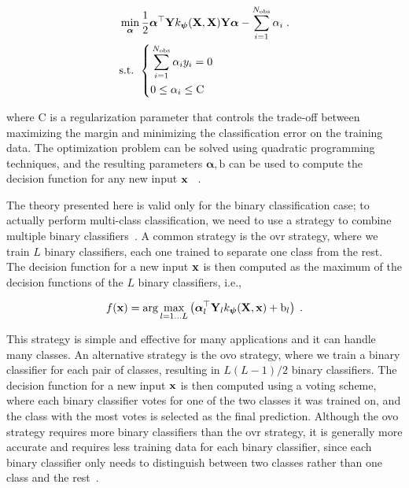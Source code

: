 \begin{equation}
  \left.
  \begin{aligned}
    &\min_{\boldsymbol{\alpha}} \frac{1}{2} \boldsymbol{\alpha}^{\top} \mathbf{Y} k_{\boldsymbol{\psi}}(\mathbf{X}, \mathbf{X}) \mathbf{Y} \boldsymbol{\alpha} - \sum_{i=1}^{N_{\mathrm{obs}}} \alpha_i\;.\\
    &\text{s.t. } \left\{
    \begin{aligned}
      &\sum_{i=1}^{N_{\mathrm{obs}}} \alpha_i y_i = 0\\
      &0 \leq \alpha_i \leq \mathrm{C}
    \end{aligned}
    \right.
  \end{aligned}
  \right.
\end{equation}

where $\mathrm{C}$ is a regularization parameter that controls the trade-off between maximizing the margin and minimizing the classification error on the training data. The optimization problem can be solved using quadratic programming techniques, and the resulting parameters $\boldsymbol{\alpha}, \mathrm{b}$ can be used to compute the decision function for any new input $\mathbf{x}$~ \cite{libsvm}.


\smallskip
The theory presented here is valid only for the binary classification case; to actually perform multi-class classification, we need to use a strategy to combine multiple binary classifiers~\cite{multi_class_classification}. A common strategy is the \gls{ovr} strategy, where we train $L$ binary classifiers, each one trained to separate one class from the rest. The decision function for a new input $\mathbf{x}$ is then computed as the maximum of the decision functions of the $L$ binary classifiers, i.e.,

\begin{equation}
  f(\mathbf{x}) = \arg\max_{l=1\ldots L} \left( \boldsymbol{\alpha}_l^{\top} \mathbf{Y}_l k_{\boldsymbol{\psi}}(\mathbf{X}, \mathbf{x}) + \mathrm{b}_l \right)\;.
\end{equation}

This strategy is simple and effective for many applications and it can handle many classes. An alternative strategy is the \gls{ovo} strategy, where we train a binary classifier for each pair of classes, resulting in $L(L-1)/2$ binary classifiers. The decision function for a new input $\mathbf{x}$ is then computed using a voting scheme, where each binary classifier votes for one of the two classes it was trained on, and the class with the most votes is selected as the final prediction. Although the \gls{ovo} strategy requires more binary classifiers than the \gls{ovr} strategy, it is generally more accurate and requires less training data for each binary classifier, since each binary classifier only needs to distinguish between two classes rather than one class and the rest~\cite{libsvm}.

